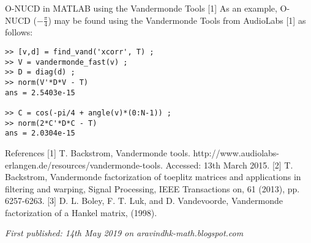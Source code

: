 O-NUCD in MATLAB using the Vandermonde Tools [1]
As an example, O-NUCD ($-\frac{\pi}{4}$) may be found using the Vandermonde Tools from AudioLabs [1] as follows:

\begin{verbatim}
>> [v,d] = find_vand('xcorr', T) ;
>> V = vandermonde_fast(v) ;
>> D = diag(d) ;
>> norm(V'*D*V - T)
ans = 2.5403e-15

>> C = cos(-pi/4 + angle(v)*(0:N-1)) ;
>> norm(2*C'*D*C - T)
ans = 2.0304e-15
\end{verbatim}

References
[1] T. Backstrom, Vandermonde tools. http://www.audiolabs-erlangen.de/resources/vandermonde-tools. Accessed: 13th March 2015.
[2] T. Backstrom, Vandermonde factorization of toeplitz matrices and applications in filtering and warping, Signal Processing, IEEE Transactions on, 61 (2013), pp. 6257-6263.
[3] D. L. Boley, F. T. Luk, and D. Vandevoorde, Vandermonde factorization of a Hankel matrix, (1998).

\emph{First published: 14th May 2019 on aravindhk-math.blogspot.com}
